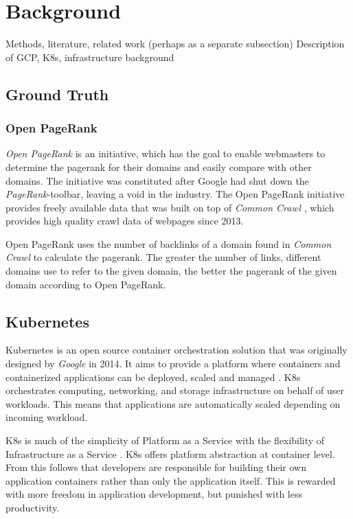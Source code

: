\section{Background}
Methods, literature, related work (perhaps as a separate subsection)
Description of GCP, K8s, infrastructure background

\subsection{Ground Truth}
\subsubsection{Open PageRank}
\label{OpenPageRank}
\textit{Open PageRank} \cite{OpenPageRank} is an initiative, which has the goal to enable webmasters to determine the pagerank for their domains and easily compare with other domains. The initiative was constituted after Google had shut down the \textit{PageRank}-toolbar, leaving a void in the industry. The Open PageRank initiative provides freely available data that was built on top of \textit{Common Crawl} \cite{CommonCrawl}, which provides high quality crawl data of webpages since 2013.

Open PageRank uses the number of backlinks of a domain found in \textit{Common Crawl} to calculate the pagerank. The greater the number of links, different domains use to refer to the given domain, the better the pagerank of the given domain according to Open PageRank.

\subsection{Kubernetes}
Kubernetes is an open source container orchestration solution that was originally designed by \textit{Google} in 2014. It aims to provide a platform where containers and containerized applications can be deployed, scaled and managed \cite{Wikik8s}. K8s orchestrates computing, networking, and storage infrastructure on behalf of user workloads. This means that applications are automatically scaled depending on incoming workload.

K8s is much of the simplicity of Platform as a Service with the flexibility of Infrastructure as a Service \cite{k8s}. K8s offers platform abstraction at container level. From this follows that developers are responsible for building their own application containers rather than only the application itself. This is rewarded with more freedom in application development, but punished with less productivity.

